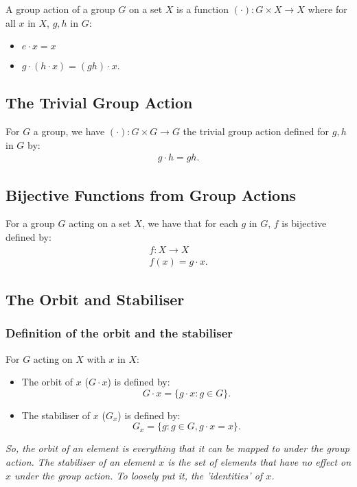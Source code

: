 \documentclass[a4paper, 12pt, twoside]{article}
\begin{document}
A group action of a group $G$ on a set $X$ is a function 
$(\cdot) : G \times X \to X$ where for all $x$ in $X$, $g, h$ in $G$:
\begin{itemize}
      \item $e \cdot x = x$ 
      \item $g \cdot (h \cdot x) = (gh) \cdot x$.
\end{itemize}

\subsection{The Trivial Group Action}

For $G$ a group, we have $(\cdot) : G \times G \to G$ the
trivial group action defined for $g, h$ in $G$ by:
\begin{align*}
      g \cdot h = gh.
\end{align*}

\subsection{Bijective Functions from Group Actions}

For a group $G$ acting on a set $X$, we have that for each $g$ in 
$G$, $f$ is bijective defined by:
\begin{gather*}
      f: X \to X \\
      f(x) = g \cdot x.
\end{gather*}

\newpage

\subsection{The Orbit and Stabiliser}

\subsubsection{Definition of the orbit and the stabiliser}

For $G$ acting on $X$ with $x$ in $X$:
\begin{itemize}
      \item The orbit of $x$ ($G \cdot x$) is defined by: $$
      G \cdot x = \{g \cdot x : g \in G\}.
      $$
      \item The stabiliser of $x$ ($G_x$) is defined by: $$
      G_x = \{g : g \in G, g \cdot x = x\}.
      $$
\end{itemize}

\textit{So, the orbit of an element is everything that it can
be mapped to under the group action. The stabiliser of an 
element $x$ is the set of elements that have no effect on $x$
under the group action. To loosely put it, the 'identities' of $x$.}
\end{document}
